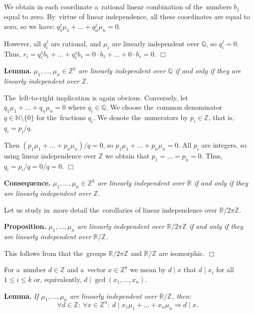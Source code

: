\documentclass[twoside]{article}
\begin{document}
    We obtain in each coordinate a~rational linear combination of the~numbers $b_j$ equal to zero.
    By~virtue of linear independence, all these coordinates are equal to zero, so we have:
    $q_1^j \mu_1 + \ldots + q_n^j \mu_n = 0$.

    However, all $q_i^j$ are rational, and $\mu_i$ are linearly independent over $\mathbb{Q}$, so $q_i^j = 0$.
    Thus, $r_i = q_i^1 b_1 + \ldots + q_i^s b_s = 0 \cdot b_1 + \ldots + 0 \cdot b_s = 0$.
\hfill$\Box$\medskip

\medskip\noindent\textbf{Lemma.}\emph{
    $\mu_1, \ldots, \mu_n \in \mathbb{Z}^k$ are linearly independent over $\mathbb{Q}$ if and only if they are linearly independent over $\mathbb{Z}$.
}\medskip

    The~left-to-right implication is again obvious. Conversely, let $q_1 \mu_1 + \ldots + q_n \mu_n = 0$ where $q_i \in \mathbb{Q}$.
    We choose the~common denominator $q \in \mathbb{N} \setminus \{ 0 \}$ for the~fractions $q_i$.
    We denote the~numerators by $p_i \in \mathbb{Z}$, that is, $q_i = p_i / q$.

    Then $(p_1 \mu_1 + \ldots + p_n \mu_n) / q = 0$, so $p_1 \mu_1 + \ldots + p_n \mu_n = 0$.
    All $p_i$ are integers, so using linear independence over $\mathbb{Z}$ we obtain that $p_1 = \ldots = p_n = 0$.
    Thus, $q_i = p_i / q = 0 / q = 0$.
\hfill$\Box$\medskip

\medskip\noindent\textbf{Consequence.}\emph{
    $\mu_1, \ldots, \mu_n \in \mathbb{Z}^k$ are linearly independent over $\mathbb{R}$ if and only if they are linearly independent over $\mathbb{Z}$.
}\medskip

Let us study in~more detail the~corollaries of linear independence over $\mathbb{R} / 2 \pi \mathbb{Z}$.

\medskip\noindent\textbf{Proposition.}\emph{
    $\mu_1, \ldots, \mu_n$ are linearly independent over $\mathbb{R} / 2 \pi \mathbb{Z}$
    if and only if they are linearly independent over $\mathbb{R} / \mathbb{Z}$.
}\medskip

    This follows from that the~groups $\mathbb{R} / 2 \pi \mathbb{Z}$ and $\mathbb{R} / \mathbb{Z}$ are isomorphic.
\hfill$\Box$\medskip

For a~number $d \in \mathbb{Z}$ and a~vector $x \in \mathbb{Z}^k$ we mean by $d \mid x$ that $d \mid x_i$ for all $1 \leq i \leq k$
or, equivalently, $d \mid \gcd(x_1, \ldots, x_n)$.

\medskip\noindent\textbf{Lemma.}\emph{
    If $\mu_1, \ldots, \mu_n$ are linearly independent over $\mathbb{R} / \mathbb{Z}$, then:
    $$
        \forall d \in \mathbb{Z}{:}\ \forall x \in \mathbb{Z}^n{:}\ d \mid x_1 \mu_1 + \ldots + x_n \mu_n \Rightarrow d \mid x.
    $$
}
\end{document}
